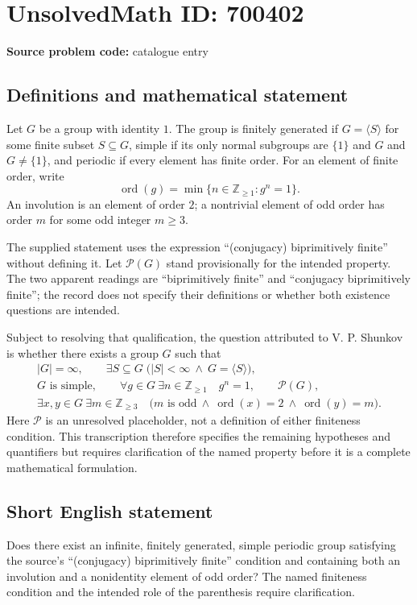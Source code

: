\documentclass[11pt]{article}
\newcommand{\Z}{\mathbb{Z}}
\begin{document}
\section*{UnsolvedMath ID: 700402}
\textbf{Source problem code:} catalogue entry
\subsection{Definitions and mathematical statement}
Let \(G\) be a group with identity \(1\). The group is finitely generated if \(G=\langle S\rangle\) for some finite subset \(S\subseteq G\), simple if its only normal subgroups are \(\{1\}\) and \(G\) and \(G\ne\{1\}\), and periodic if every element has finite order. For an element of finite order, write
\[
\operatorname{ord}(g)=\min\{n\in\Z_{\geq 1}:g^n=1\}.
\]
An involution is an element of order \(2\); a nontrivial element of odd order has order \(m\) for some odd integer \(m\geq3\).

The supplied statement uses the expression ``(conjugacy) biprimitively finite'' without defining it. Let \(\mathcal P(G)\) stand provisionally for the intended property. The two apparent readings are ``biprimitively finite'' and ``conjugacy biprimitively finite''; the record does not specify their definitions or whether both existence questions are intended.

Subject to resolving that qualification, the question attributed to V. P. Shunkov is whether there exists a group \(G\) such that
\[
\begin{gathered}
|G|=\infty,\qquad
\exists S\subseteq G\;\bigl(|S|<\infty\ \land\ G=\langle S\rangle\bigr),\\
G\text{ is simple},\qquad
\forall g\in G\ \exists n\in\Z_{\geq1}\quad g^n=1,\qquad
\mathcal P(G),\\
\exists x,y\in G\ \exists m\in\Z_{\geq3}\quad
\bigl(m\text{ is odd}\ \land\ \operatorname{ord}(x)=2\ \land\ \operatorname{ord}(y)=m\bigr).
\end{gathered}
\]
Here \(\mathcal P\) is an unresolved placeholder, not a definition of either finiteness condition. This transcription therefore specifies the remaining hypotheses and quantifiers but requires clarification of the named property before it is a complete mathematical formulation.
\subsection{Short English statement}
Does there exist an infinite, finitely generated, simple periodic group satisfying the source's ``(conjugacy) biprimitively finite'' condition and containing both an involution and a nonidentity element of odd order? The named finiteness condition and the intended role of the parenthesis require clarification.
\end{document}
